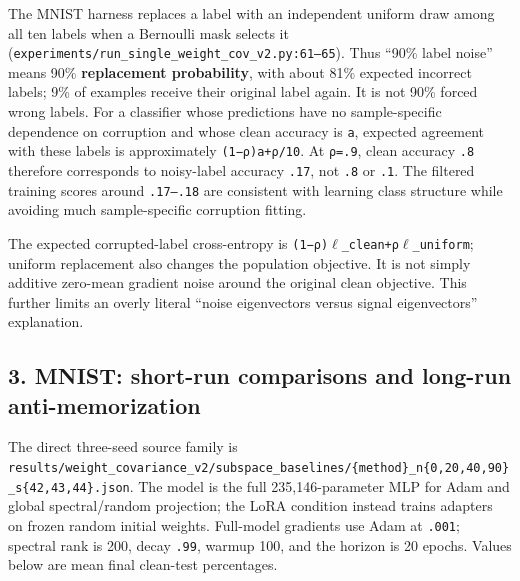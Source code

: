 \documentclass[
  british,
  10pt,
  a4paper,
]{article}
\begin{document}
The MNIST harness replaces a label with an independent uniform draw
among all ten labels when a Bernoulli mask selects it
(\texttt{experiments/\allowbreak{}run\_\allowbreak{}single\_\allowbreak{}weight\_\allowbreak{}cov\_\allowbreak{}v2.\allowbreak{}py:\allowbreak{}61–65}).
Thus ``90\% label noise'' means 90\% \textbf{replacement probability},
with about 81\% expected incorrect labels; 9\% of examples receive their
original label again. It is not 90\% forced wrong labels. For a
classifier whose predictions have no sample-\allowbreak{}specific
dependence on corruption and whose clean accuracy is \texttt{a},
expected agreement with these labels is approximately
\texttt{(1−ρ)a+ρ/\allowbreak{}10}. At \texttt{ρ=.9}, clean accuracy
\texttt{.8} therefore corresponds to noisy-\allowbreak{}label accuracy
\texttt{.17}, not \texttt{.8} or \texttt{.1}. The filtered training
scores around \texttt{.17–.18} are consistent with learning class
structure while avoiding much sample-\allowbreak{}specific corruption
fitting.

The expected corrupted-\allowbreak{}label cross-\allowbreak{}entropy is
\texttt{(1−ρ)\(\ell\)\_\allowbreak{}clean+ρ\(\ell\)\_\allowbreak{}uniform};
uniform replacement also changes the population objective. It is not
simply additive zero-mean gradient noise around the original clean
objective. This further limits an overly literal ``noise eigenvectors
versus signal eigenvectors'' explanation.\allowbreak{}

\subsection{\texorpdfstring{3. MNIST: short-run comparisons and long-run
anti-\allowbreak{}memorization\allowbreak{}}{3. MNIST: short-run comparisons and long-run }}\label{classical-evidence--mnist-short-run-comparisons-and-long-run-anti-memorization}

The direct three-seed source family is
\texttt{results/\allowbreak{}weight\_\allowbreak{}covariance\_\allowbreak{}v2/\allowbreak{}subspace\_\allowbreak{}baselines/\allowbreak{}\{\allowbreak{}method\}\allowbreak{}\_\allowbreak{}n\{\allowbreak{}0,\allowbreak{}20,\allowbreak{}40,\allowbreak{}90\}\allowbreak{}\_\allowbreak{}s\{\allowbreak{}42,\allowbreak{}43,\allowbreak{}44\}\allowbreak{}.\allowbreak{}json}.
The model is the full 235,\allowbreak{}146-\allowbreak{}parameter MLP
for Adam and global spectral/\allowbreak{}random projection; the LoRA
condition instead trains adapters on frozen random initial weights.
Full-model gradients use Adam at \texttt{.001}; spectral rank is 200,
decay \texttt{.99}, warmup 100, and the horizon is 20 epochs. Values
below are mean final clean-test percentages.\allowbreak{}
\end{document}
